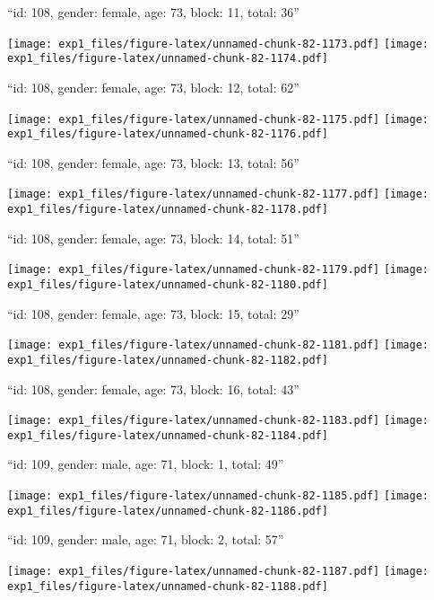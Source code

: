 \documentclass[11pt,,]{article}
\begin{document}
\newpage
[1] 

``id: 108, gender: female, age: 73, block: 11, total: 36''

\texttt{[image: exp1\_files/figure-latex/unnamed-chunk-82-1173.pdf]}
\texttt{[image: exp1\_files/figure-latex/unnamed-chunk-82-1174.pdf]}

\newpage
[1] 

``id: 108, gender: female, age: 73, block: 12, total: 62''

\texttt{[image: exp1\_files/figure-latex/unnamed-chunk-82-1175.pdf]}
\texttt{[image: exp1\_files/figure-latex/unnamed-chunk-82-1176.pdf]}

\newpage
[1] 

``id: 108, gender: female, age: 73, block: 13, total: 56''

\texttt{[image: exp1\_files/figure-latex/unnamed-chunk-82-1177.pdf]}
\texttt{[image: exp1\_files/figure-latex/unnamed-chunk-82-1178.pdf]}

\newpage
[1] 

``id: 108, gender: female, age: 73, block: 14, total: 51''

\texttt{[image: exp1\_files/figure-latex/unnamed-chunk-82-1179.pdf]}
\texttt{[image: exp1\_files/figure-latex/unnamed-chunk-82-1180.pdf]}

\newpage
[1] 

``id: 108, gender: female, age: 73, block: 15, total: 29''

\texttt{[image: exp1\_files/figure-latex/unnamed-chunk-82-1181.pdf]}
\texttt{[image: exp1\_files/figure-latex/unnamed-chunk-82-1182.pdf]}

\newpage
[1] 

``id: 108, gender: female, age: 73, block: 16, total: 43''

\texttt{[image: exp1\_files/figure-latex/unnamed-chunk-82-1183.pdf]}
\texttt{[image: exp1\_files/figure-latex/unnamed-chunk-82-1184.pdf]}

\newpage
[1] 

``id: 109, gender: male, age: 71, block: 1, total: 49''

\texttt{[image: exp1\_files/figure-latex/unnamed-chunk-82-1185.pdf]}
\texttt{[image: exp1\_files/figure-latex/unnamed-chunk-82-1186.pdf]}

\newpage
[1] 

``id: 109, gender: male, age: 71, block: 2, total: 57''

\texttt{[image: exp1\_files/figure-latex/unnamed-chunk-82-1187.pdf]}
\texttt{[image: exp1\_files/figure-latex/unnamed-chunk-82-1188.pdf]}
\end{document}
